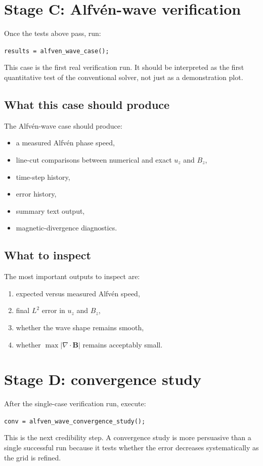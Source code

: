 \documentclass[11pt]{article}
\begin{document}
\section{Stage C: Alfv\'en-wave verification}
Once the tests above pass, run:
\begin{center}
\texttt{results = alfven\_wave\_case();}
\end{center}
This case is the first real verification run. It should be interpreted as the first quantitative test of the conventional solver, not just as a demonstration plot.

\subsection{What this case should produce}
The Alfv\'en-wave case should produce:
\begin{itemize}[leftmargin=1.8em]
    \item a measured Alfv\'en phase speed,
    \item line-cut comparisons between numerical and exact $u_z$ and $B_z$,
    \item time-step history,
    \item error history,
    \item summary text output,
    \item magnetic-divergence diagnostics.
\end{itemize}

\subsection{What to inspect}
The most important outputs to inspect are:
\begin{enumerate}[leftmargin=1.8em]
    \item expected versus measured Alfv\'en speed,
    \item final $L^2$ error in $u_z$ and $B_z$,
    \item whether the wave shape remains smooth,
    \item whether $\max |\nabla \cdot \mathbf{B}|$ remains acceptably small.
\end{enumerate}

\section{Stage D: convergence study}
After the single-case verification run, execute:
\begin{center}
\texttt{conv = alfven\_wave\_convergence\_study();}
\end{center}
This is the next credibility step. A convergence study is more persuasive than a single successful run because it tests whether the error decreases systematically as the grid is refined.
\end{document}
